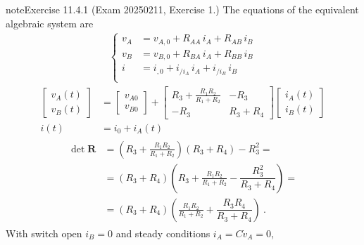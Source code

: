 \documentclass[letterpaper,10pt,english]{jupyterBook}
\begin{document}
\begin{sphinxadmonition}{note}{Exercise 11.4.1 (Exam 2025\sphinxhyphen{}02\sphinxhyphen{}11, Exercise 1.)}
\sphinxAtStartPar
The equations of the equivalent algebraic system are
\begin{equation*}
\begin{split}\begin{cases}
 v_A & = v_{A,0} + R_{AA}   \, i_A + R_{AB}   \, i_B \\
 v_B & = v_{B,0} + R_{BA}   \, i_A + R_{BB}   \, i_B \\
 i   & = i_{ ,0} + i_{/i_A} \, i_A + i_{/i_B} \, i_B \\
\end{cases}\end{split}
\end{equation*}\begin{equation*}
\begin{split}
\begin{bmatrix} v_A(t) \\ v_B(t) \end{bmatrix} & =
\begin{bmatrix} v_{A0} \\ v_{B0} \end{bmatrix} + 
\begin{bmatrix}
  R_3 + \frac{R_1 R_2}{R_1 + R_2} & -R_3 \\ -R_3 & R_3 + R_4
\end{bmatrix}
\begin{bmatrix} i_A(t) \\ i_B(t) \end{bmatrix} \\
i(t) & = i_0 + i_A(t)
\end{split}
\end{equation*}\begin{equation*}
\begin{split}\begin{aligned}
  \det \mathbf{R}
  & = \left( R_3 + \frac{R_1 R_2}{R_1 + R_2}  \right) \left( R_3 + R_4 \right) - R_3^2 = \\
  & = ( R_3 + R_4 ) \left( R_3 + \frac{R_1 R_2}{R_1 + R_2} - \dfrac{R_3^2}{R_3 + R_4} \right) = \\
  & = ( R_3 + R_4 ) \left( \frac{R_1 R_2}{R_1 + R_2} + \dfrac{R_3 R_4}{R_3 + R_4} \right) \ .
\end{aligned}\end{split}
\end{equation*}
\sphinxAtStartPar
{} With switch open \(i_B = 0\) and steady conditions \(i_A = C \dot{v}_A = 0\),
\begin{equation*}

\end{equation*}
\end{sphinxadmonition}
\end{document}
